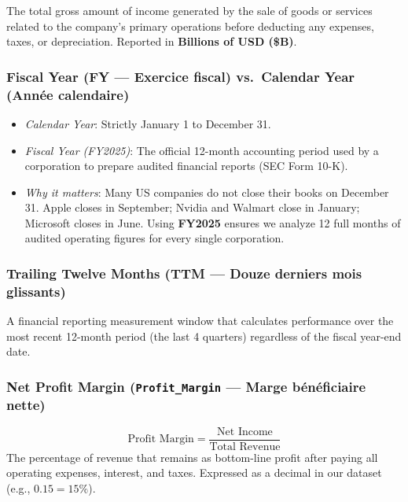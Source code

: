 \documentclass[
]{article}
\providecommand{\tightlist}{%
  \setlength{\itemsep}{0pt}\setlength{\parskip}{0pt}}
\begin{document}
The total gross amount of income generated by the sale of goods or
services related to the company's primary operations before deducting
any expenses, taxes, or depreciation. Reported in \textbf{Billions of
USD (\$B)}.

\subsubsection{Fiscal Year (FY --- Exercice fiscal) vs.~Calendar Year
(Année
calendaire)}\label{fiscal-year-fy-exercice-fiscal-vs.-calendar-year-annuxe9e-calendaire}

\begin{itemize}
\tightlist
\item
  \emph{Calendar Year}: Strictly January 1 to December 31.
\item
  \emph{Fiscal Year (FY2025)}: The official 12-month accounting period
  used by a corporation to prepare audited financial reports (SEC Form
  10-K).
\item
  \emph{Why it matters}: Many US companies do not close their books on
  December 31. Apple closes in September; Nvidia and Walmart close in
  January; Microsoft closes in June. Using \textbf{FY2025} ensures we
  analyze 12 full months of audited operating figures for every single
  corporation.
\end{itemize}

\subsubsection{Trailing Twelve Months (TTM --- Douze derniers mois
glissants)}\label{trailing-twelve-months-ttm-douze-derniers-mois-glissants}

A financial reporting measurement window that calculates performance
over the most recent 12-month period (the last 4 quarters) regardless of
the fiscal year-end date.

\subsubsection{\texorpdfstring{Net Profit Margin
(\texttt{Profit\_Margin} --- Marge bénéficiaire
nette)}{Net Profit Margin (Profit\_Margin --- Marge bénéficiaire nette)}}\label{net-profit-margin-profit_margin-marge-buxe9nuxe9ficiaire-nette}

\[\text{Profit Margin} = \frac{\text{Net Income}}{\text{Total Revenue}}\]
The percentage of revenue that remains as bottom-line profit after
paying all operating expenses, interest, and taxes. Expressed as a
decimal in our dataset (e.g., \(0.15 = 15\%\)).
\end{document}
